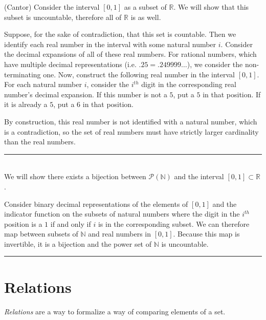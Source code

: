 \documentclass[twoside]{article}
\newenvironment{proof}{{\bf Proof:}}{\hfill\rule{2mm}{2mm}}
\begin{document}
\begin{proof}(Cantor)
	Consider the interval $[0,1]$ as a subset of $\mathbb{R}$.  We will show that this subset is uncountable, therefore all of $\mathbb{R}$ is as well.
	
	Suppose, for the sake of contradiction, that this set is countable.  Then we identify each real number in the interval with some natural number $i$.  Consider the decimal expansions of all of these real numbers.  For rational numbers, which have multiple decimal representations (i.e. $.25 = .249999\dots$), we consider the non-terminating one.  Now, construct the following real number in the interval $[0,1]$.  For each natural number $i$, consider the $i^{th}$ digit in the corresponding real number's decimal expansion.  If this number is not a $5$, put a $5$ in that position.  If it is already a $5$, put a $6$ in that position.  
	
	By construction, this real number is not identified with a natural number, which is a contradiction, so the set of real numbers must have strictly larger cardinality than the real numbers.
	
\end{proof}

\\

\begin{proof}
	We will show there exists a bijection between $\mathcal{P}(\mathbb{N})$ and the interval $[0,1]\subset \mathbb{R}$.
	
	Consider binary decimal representations of the elements of $[0,1]$ and the indicator function on the subsets of natural numbers where the digit in the $i^{th}$ position is a $1$ if and only if $i$ is in the corresponding subset.  We can therefore map between subsets of $\mathbb{N}$ and real numbers in $[0,1]$.  Because this map is invertible, it is a bijection and the power set of $\mathbb{N}$ is uncountable.
	
\end{proof}


\section{Relations}

\textit{Relations} are a way to formalize a way of comparing elements of a set.

\end{document}
